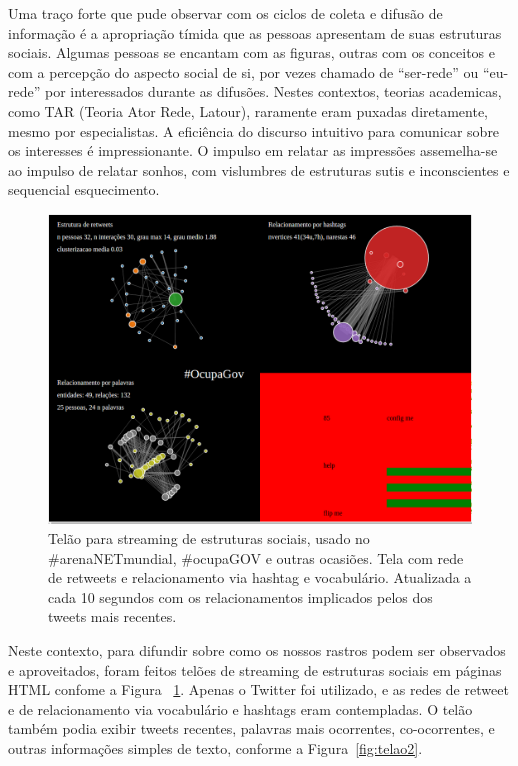 \documentclass[a4paper, 11pt]{article} %
\begin{document}
Uma traço forte que pude observar com os ciclos de coleta e difusão de informação é a apropriação tímida que as pessoas apresentam de suas estruturas sociais. Algumas pessoas se encantam com as figuras, outras com os conceitos e com a percepção do aspecto social de si, por vezes chamado de ``ser-rede'' ou ``eu-rede'' por interessados durante as difusões. Nestes contextos, teorias academicas, como TAR (Teoria Ator Rede, Latour), raramente eram puxadas diretamente, mesmo por especialistas. A eficiência do discurso intuitivo para comunicar sobre os interesses é impressionante. O impulso em relatar as impressões assemelha-se ao impulso de relatar sonhos, com vislumbres de estruturas sutis e inconscientes e sequencial esquecimento.

\begin{figure}[h!]
  \centering
    \includegraphics[width=.7\textwidth]{telao1.png}
  \caption{\small Telão para streaming de estruturas sociais, usado no \#arenaNETmundial, \#ocupaGOV e outras ocasiões. Tela com rede de retweets e relacionamento via hashtag e vocabulário. Atualizada a cada 10 segundos com os relacionamentos implicados pelos dos tweets mais recentes.}\label{fig:telao1}
\end{figure}


Neste contexto, para difundir sobre como os nossos rastros podem ser observados e aproveitados, foram feitos telões de streaming de estruturas sociais em páginas HTML confome a Figura ~\ref{fig:telao1}. Apenas o Twitter foi utilizado, e as redes de retweet e de relacionamento via vocabulário e hashtags eram contempladas. O telão também podia exibir tweets recentes, palavras mais ocorrentes, co-ocorrentes, e outras informações simples de texto, conforme a Figura~\ref{fig:telao2}.
\end{document}
